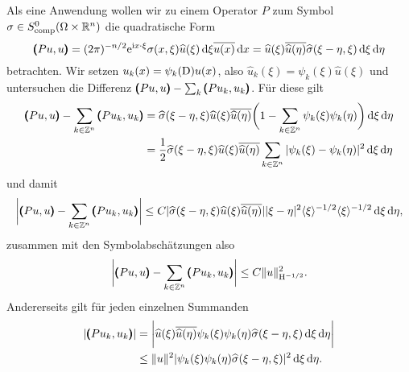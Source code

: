 Als eine Anwendung wollen wir zu einem Operator $P$ zum Symbol $\sigma\in S^0_{\rm comp} (\Omega\times\mathbb R^n)$ die quadratische Form
\begin{equation}
   \pmb(Pu,u\pmb) = (2\pi)^{-n/2} \relax \mathrm e^{\mathrm i x\cdot\xi} \sigma(x,\xi) \widehat u(\xi) \,\mathrm d\xi \overline{u(x)}\,\mathrm d x 
   = \relax \widehat u(\xi) \overline{\widehat u(\eta)} \widehat\sigma(\xi-\eta,\xi) \,\mathrm d\xi\,\mathrm d\eta
\end{equation} 
betrachten. Wir setzen $u_k(x) = \psi_k(\mathrm D) u(x)$, also $\widehat u_k(\xi) = \psi_k(\xi) \widehat u(\xi)$ und untersuchen die Differenz 
$\pmb(Pu,u\pmb)-\sum_k \pmb(Pu_k,u_k\pmb)$. Für diese gilt
\begin{align}
       \pmb(Pu,u\pmb) -\sum_{k\in\mathbb Z^n} \pmb(Pu_k,u_k\pmb)  &=  \relax \widehat\sigma (\xi-\eta,\xi) \widehat u(\xi) \overline{\widehat u(\eta)} \bigg( 1 - \sum_{k\in\mathbb Z^n} \psi_k(\xi)\psi_k(\eta)\bigg) \,\mathrm d\xi\,\mathrm d\eta  \notag\\
       &= \frac12 \relax \widehat\sigma (\xi-\eta,\xi) \widehat u(\xi) \overline{\widehat u(\eta)}  \sum_{k\in\mathbb Z^n} | \psi_k(\xi)-\psi_k(\eta)|^2 \,\mathrm d\xi\,\mathrm d\eta 
\end{align}
und damit
\begin{equation}
   \bigg|\pmb(Pu,u\pmb) - \sum_{k\in\mathbb Z^n}\pmb(Pu_k,u_k\pmb)\bigg| \le C \relax | \widehat \sigma(\xi-\eta,\xi) \widehat u(\xi) \overline{\widehat u(\eta)}| |\xi-\eta|^2 \langle\xi\rangle^{-1/2} \langle\xi\rangle^{-1/2} \,\mathrm d\xi\,\mathrm d\eta, 
\end{equation}
zusammen mit den Symbolabschätzungen also
\begin{equation}
    \bigg|\pmb(Pu,u\pmb) - \sum_{k\in\mathbb Z^n}\pmb(Pu_k,u_k\pmb)\bigg| \le C \|u\|_{\mathrm H^{-1/2}}^2.
\end{equation}
 Andererseits gilt für jeden einzelnen Summanden
 \begin{align}
     |\pmb(Pu_k,u_k\pmb) | &= \bigg|\relax \widehat u(\xi) \overline{\widehat u(\eta)} \psi_k(\xi)\psi_k(\eta) \widehat\sigma(\xi-\eta,\xi) \,\mathrm d\xi\,\mathrm d\eta\bigg|
     \notag\\
     &\le \|u\|^2 \relax | \psi_k(\xi)\psi_k(\eta) \widehat\sigma(\xi-\eta,\xi)|^2 \,\mathrm d\xi\,\mathrm d\eta.
 \end{align}






